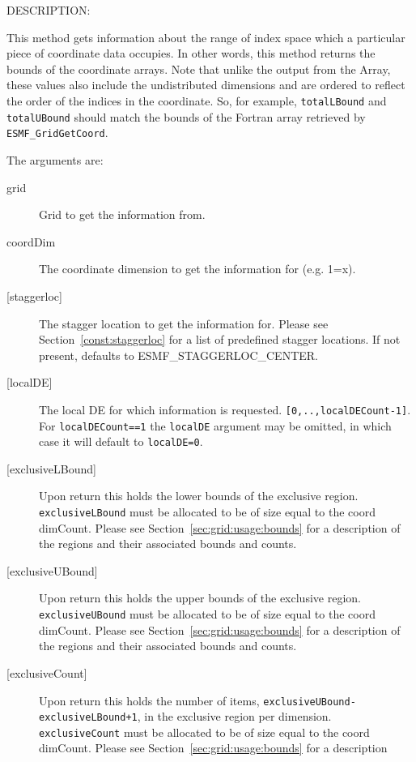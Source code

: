 {\sf DESCRIPTION:\\ }


    This method gets information about the range of index space which a particular
    piece of coordinate data occupies.  In other words, this method returns the
    bounds of the coordinate arrays.  Note that unlike the output from the
    Array, these values also include the undistributed dimensions and are
    ordered to reflect the order of the indices in the coordinate. So, for example,
    {\tt totalLBound} and {\tt totalUBound} should match the bounds of the Fortran array
    retrieved by {\tt ESMF\_GridGetCoord}.
  
  The arguments are:
  \begin{description}
  \item[grid]
      Grid to get the information from.
  \item[coordDim]
       The coordinate dimension to get the information for (e.g. 1=x).
  \item[{[staggerloc]}]
       The stagger location to get the information for.
       Please see Section~\ref{const:staggerloc} for a list
       of predefined stagger locations. If not present, defaults to
       ESMF\_STAGGERLOC\_CENTER.
  \item[{[localDE]}]
            The local DE for which information is requested. {\tt [0,..,localDECount-1]}.
            For {\tt localDECount==1} the {\tt localDE} argument may be omitted,
            in which case it will default to {\tt localDE=0}.
  \item[{[exclusiveLBound]}]
       Upon return this holds the lower bounds of the exclusive region.
       {\tt exclusiveLBound} must be allocated to be of size equal to the coord dimCount.
       Please see Section~\ref{sec:grid:usage:bounds} for a description
       of the regions and their associated bounds and counts.
  \item[{[exclusiveUBound]}]
       Upon return this holds the upper bounds of the exclusive region.
       {\tt exclusiveUBound} must be allocated to be of size equal to the coord dimCount.
       Please see Section~\ref{sec:grid:usage:bounds} for a description
       of the regions and their associated bounds and counts.
  \item[{[exclusiveCount]}]
       Upon return this holds the number of items, {\tt exclusiveUBound-exclusiveLBound+1},
       in the exclusive region per dimension.
       {\tt exclusiveCount} must
       be allocated to be of size equal to the coord dimCount.
       Please see Section~\ref{sec:grid:usage:bounds} for a description

\end{description}

